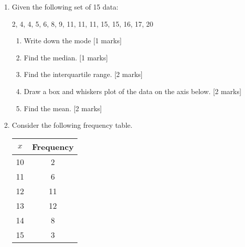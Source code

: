 \documentclass[12pt, twoside]{article}
\begin{document}
\begin{enumerate}
\item Given the following set of 15 data:
    \begin{center}
    2, 4, 4, 5, 6, 8, 9, 11, 11, 11, 15, 15, 16, 17, 20
  \end{center}
  \begin{enumerate}
    \item Write down the mode \hfill [1 marks] \vspace{0.75cm}
    \item Find the median. \hfill [1 marks] \vspace{0.75cm}
    \item Find the interquartile range. \hfill [2 marks] \vspace{1cm}
    \item Draw a box and whiskers plot of the data on the axis below. \hfill [2 marks] \vspace{1cm}
      \begin{center}
      \end{center} \vspace{1cm}
      \item Find the mean. \hfill [2 marks]
    \end{enumerate}

\newpage
\item Consider the following frequency table.
\begin{center}
  \begin{tabular}{|c|c|}
    \hline
    $x$ & Frequency\\ 
    \hline 
    10 & 2 \\ 
    \hline 
    11 & 6 \\ 
    \hline 
    12 & 11 \\ 
    \hline 
    13 & 12 \\ 
    \hline 
    14 & 8 \\ 
    \hline 
    15 & 3 \\ 
    \hline 
    \end{tabular}
\end{center}


\end{enumerate}
\end{document}
